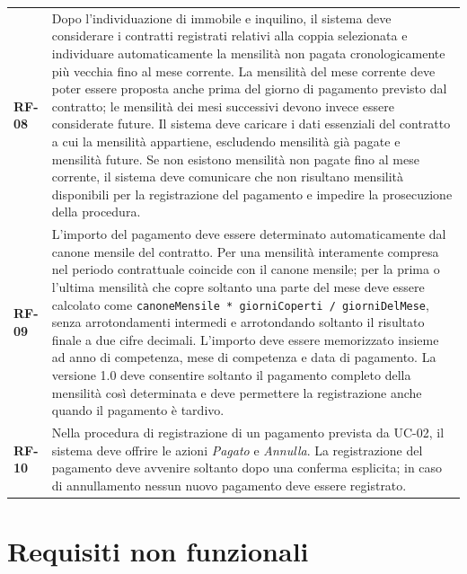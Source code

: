 \documentclass[12pt,a4paper]{article}
\newcommand{\req}[1]{\textbf{#1}}
\begin{document}
\begin{longtable}{>{\raggedright\arraybackslash}p{1.8cm}
                  >{\raggedright\arraybackslash}p{13cm}}
\req{RF-08} &
Dopo l'individuazione di immobile e inquilino, il sistema deve considerare i
contratti registrati relativi alla coppia selezionata e individuare
automaticamente la mensilità non pagata cronologicamente più vecchia fino al
mese corrente.
La mensilità del mese corrente deve poter essere proposta anche prima del
giorno di pagamento previsto dal contratto; le mensilità dei mesi successivi
devono invece essere considerate future.
Il sistema deve caricare i dati essenziali del contratto a cui la mensilità
appartiene, escludendo mensilità già pagate e mensilità future.
Se non esistono mensilità non pagate fino al mese corrente, il sistema deve
comunicare che non risultano mensilità disponibili per la registrazione del
pagamento e impedire la prosecuzione della procedura. \\

\req{RF-09} &
L'importo del pagamento deve essere determinato automaticamente dal canone mensile del
contratto. Per una mensilità interamente compresa nel periodo contrattuale coincide con il canone
mensile; per la prima o l'ultima mensilità che copre soltanto una parte del mese deve essere
calcolato come \texttt{canoneMensile * giorniCoperti / giorniDelMese}, senza arrotondamenti
intermedi e arrotondando soltanto il risultato finale a due cifre decimali. L'importo deve essere
memorizzato insieme ad anno di competenza, mese di competenza e data di pagamento. La versione
1.0 deve consentire soltanto il pagamento completo della mensilità così determinata e deve
permettere la registrazione anche quando il pagamento è tardivo. \\

\req{RF-10} &
Nella procedura di registrazione di un pagamento prevista da UC-02, il sistema deve
offrire le azioni \emph{Pagato} e \emph{Annulla}. La registrazione del pagamento deve
avvenire soltanto dopo una conferma esplicita; in caso di annullamento nessun nuovo
pagamento deve essere registrato. \\

\bottomrule
\end{longtable}

\section{Requisiti non funzionali}
\end{document}
